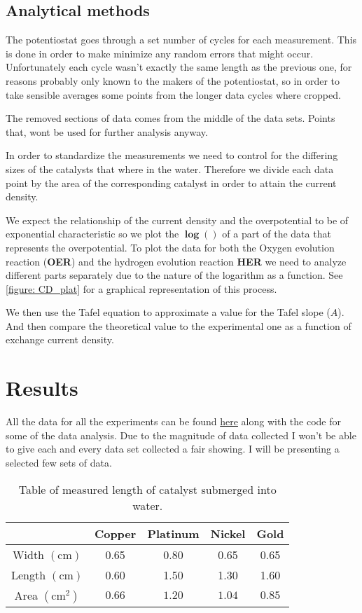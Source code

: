 \documentclass[twocolumn, floatfix]{revtex4-2}
\begin{document}
\subsection{Analytical methods}
The potentiostat goes through a set number of cycles for each measurement.
This is done in order to make minimize any random errors that might occur. Unfortunately
each cycle wasn't exactly the same length as the previous one, for reasons probably only
known to the makers of the potentiostat, so in order to take sensible averages
some points from the longer data cycles where cropped.
\par
The removed sections of data comes from the middle of the data sets. Points that, wont be
used for further analysis anyway.
\par
In order to standardize the measurements we need to control for the differing sizes of the catalysts
that where in the water. Therefore we divide each data point by the area of the corresponding
catalyst in order to attain the current density.
\par
We expect the relationship of the current density and the overpotential to be of exponential
characteristic so we plot the $\bm{\log{()}} $ of a part of the data that represents the overpotential.
To plot the data for both the Oxygen evolution reaction (\textbf{OER}) and the hydrogen evolution
reaction \textbf{HER} we need to analyze different parts separately due to the nature of the logarithm
as a function. See \ref{figure: CD_plat} for a graphical representation of this process.

\par
We then use the Tafel equation to approximate a value for the Tafel slope ($A$). And then compare
the theoretical value to the experimental one as a function of exchange current density.

\section{Results}
All the data for all the experiments can be found \href{
https://www.github.com/SixtenNordegren/Water_Electrolysis}{here} along with the code 
for some of the data analysis. Due to the magnitude of data collected I won't be able to
give each and every data set collected a fair showing. I will be presenting a selected 
few sets of data.


\begin{table}[h]
\begin{tabular}{|c|c|c|c|c|}
	\hline
	& Copper & Platinum & Nickel & Gold \\
	\hline
	Width $(\text{cm})$&0.65 &0.80&0.65&0.65\\
	\hline
	Length $(\text{cm})$ &0.60&1.50&1.30&1.60\\
	\hline
	Area $(\text{cm}^2)$ &$0.66$&$1.20$&$1.04$&$0.85$\\
	\hline
\end{tabular}
	\caption{Table of measured length of catalyst submerged into water.\label{table: area}}
\end{table}
\end{document}

